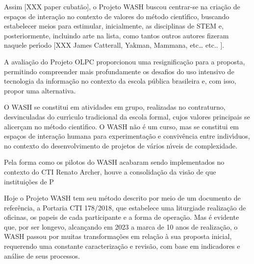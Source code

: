 \documentclass[
12pt,		%
openright,	%
twoside,  %
a4paper,			%
chapter=TITLE,		%
english,			%
french,				%
spanish,			%
brazil				%
]{USPSC-classe/USPSC_RedarTex}
\begin{document}
Assim [XXX paper cubat\~ao], o Projeto WASH buscou centrar-se na cria\c{c}\~ao de espa\c{c}os de intera\c{c}\~ao no contexto de valores do m\'etodo cient\'{\i}fico, buscando estabelecer meios para estimular, inicialmente, as disciplinas de STEM e, posteriormente, incluindo arte na lista, como tantos outros autores fizeram naquele per\'{\i}odo [XXX James Catterall, Yakman, Mammana, etc… etc.. ].








A avalia\c{c}\~ao do Projeto OLPC proporcionou uma resignifica\c{c}\~ao para a proposta, permitindo compreender mais profundamente os desafios do uso intensivo de tecnologia da informa\c{c}\~ao no contexto da escola p\'ublica brasileira e, com isso, propor uma alternativa.








O WASH se constitui em atividades em grupo, realizadas no contraturno, desvinculadas do curr\'{\i}culo tradicional da escola formal, cujos valores principais se alicer\c{c}am no m\'etodo cient\'{\i}fico. O WASH n\~ao \'e um curso, mas se constitui em espa\c{c}os de intera\c{c}\~ao humana para experimenta\c{c}\~ao e conviv\^encia entre indiv\'{\i}duos, no contexto do desenvolvimento de projetos de v\'arios n\'{\i}veis de complexidade.








Pela forma como os pilotos do WASH acabaram sendo implementados no contexto do CTI Renato Archer, houve a consolida\c{c}\~ao da vis\~ao de que institui\c{c}\~oes de P








Hoje o Projeto WASH tem seu m\'etodo descrito por meio de um documento de refer\^encia, a Portaria CTI 178/2018, que estabelece uma \textquotedbl liturgia de realiza\c{c}\~ao de oficinas, os papeis de cada participante e a forma de opera\c{c}\~ao. Mas \'e evidente que, por ser longevo, alcan\c{c}ando em 2023 a marca de 10 anos de realiza\c{c}\~ao, o WASH passou por muitas transforma\c{c}\~oes em rela\c{c}\~ao \`a sua proposta inicial, requerendo uma constante caracteriza\c{c}\~ao e revis\~ao, com base em indicadores e an\'alise de seus processos.
\end{document}
